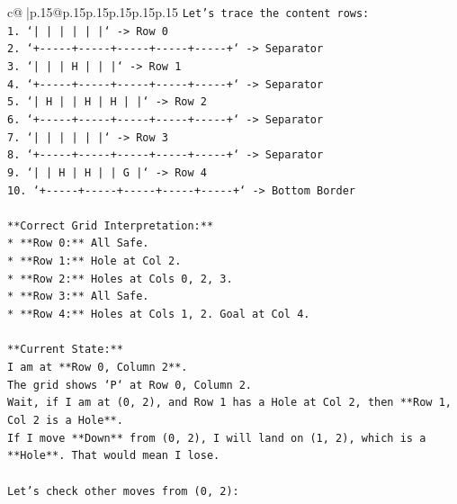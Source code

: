 \documentclass{article}
\begin{document}
{\begin{supertabular}{c@{$\;$}|p{.15\linewidth}@{}p{.15\linewidth}p{.15\linewidth}p{.15\linewidth}p{.15\linewidth}p{.15\linewidth}}
{{{\texttt{Let's trace the content rows:} \\
\texttt{1. `|     |     |     |     |     |` {-}> Row 0} \\
\texttt{2. `+{-}{-}{-}{-}{-}+{-}{-}{-}{-}{-}+{-}{-}{-}{-}{-}+{-}{-}{-}{-}{-}+{-}{-}{-}{-}{-}+` {-}> Separator} \\
\texttt{3. `|     |     |  H  |     |     |` {-}> Row 1} \\
\texttt{4. `+{-}{-}{-}{-}{-}+{-}{-}{-}{-}{-}+{-}{-}{-}{-}{-}+{-}{-}{-}{-}{-}+{-}{-}{-}{-}{-}+` {-}> Separator} \\
\texttt{5. `|  H  |     |  H  |  H  |     |` {-}> Row 2} \\
\texttt{6. `+{-}{-}{-}{-}{-}+{-}{-}{-}{-}{-}+{-}{-}{-}{-}{-}+{-}{-}{-}{-}{-}+{-}{-}{-}{-}{-}+` {-}> Separator} \\
\texttt{7. `|     |     |     |     |     |` {-}> Row 3} \\
\texttt{8. `+{-}{-}{-}{-}{-}+{-}{-}{-}{-}{-}+{-}{-}{-}{-}{-}+{-}{-}{-}{-}{-}+{-}{-}{-}{-}{-}+` {-}> Separator} \\
\texttt{9. `|     |  H  |  H  |     |  G  |` {-}> Row 4} \\
\texttt{10. `+{-}{-}{-}{-}{-}+{-}{-}{-}{-}{-}+{-}{-}{-}{-}{-}+{-}{-}{-}{-}{-}+{-}{-}{-}{-}{-}+` {-}> Bottom Border} \\
\\ 
\texttt{**Correct Grid Interpretation:**} \\
\texttt{*   **Row 0:** All Safe.} \\
\texttt{*   **Row 1:** Hole at Col 2.} \\
\texttt{*   **Row 2:** Holes at Cols 0, 2, 3.} \\
\texttt{*   **Row 3:** All Safe.} \\
\texttt{*   **Row 4:** Holes at Cols 1, 2. Goal at Col 4.} \\
\\ 
\texttt{**Current State:**} \\
\texttt{I am at **Row 0, Column 2**.} \\
\texttt{The grid shows `P` at Row 0, Column 2.} \\
\texttt{Wait, if I am at (0, 2), and Row 1 has a Hole at Col 2, then **Row 1, Col 2 is a Hole**.} \\
\texttt{If I move **Down** from (0, 2), I will land on (1, 2), which is a **Hole**. That would mean I lose.} \\
\\ 
\texttt{Let's check other moves from (0, 2):} \\
}}}
\end{supertabular}}
\end{document}
